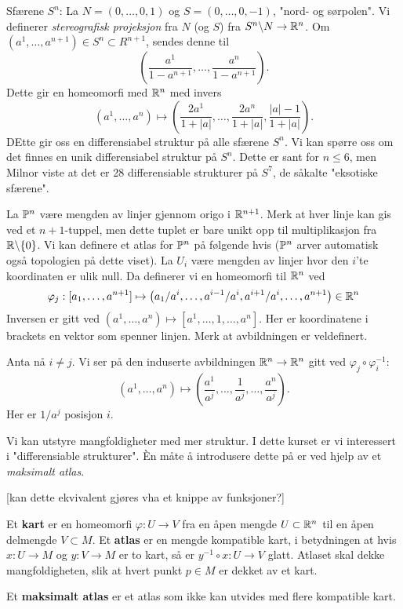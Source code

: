 \documentclass[11pt, english]{article}
\begin{document}
\begin{example}
Sfærene $S^n$: La $N=(0,\ldots,0,1)$ og $S=(0,\ldots,0,-1)$, "nord- og sørpolen". Vi definerer \emph{stereografisk projeksjon} fra $N$ (og $S$) fra $S^n \backslash N \to \mathbb{R}^n$. Om $(a^1,\ldots,a^{n+1}) \in S^n \subset R^{n+1}$, sendes denne til
$$
\left( \frac{a^1}{1-a^{n+1}}, \ldots, \frac{a^n}{1-a^{n+1}} \right).
$$
Dette gir en homeomorfi med $\mathbb{R}^n$ med invers
$$
(a^1, \ldots, a^n) \mapsto \left( \frac{2a^1}{1+\lvert a \rvert}, \ldots, \frac{2 a^n}{1+\lvert a \rvert}, \frac{\lvert a \rvert - 1}{1+\lvert a \rvert}\right).
$$
DEtte gir oss en differensiabel struktur på alle sfærene $S^n$. Vi kan spørre oss om det finnes en unik differensiabel struktur på $S^n$. Dette er sant for $n \leq 6$, men Milnor viste at det er 28 differensiable strukturer på $S^7$, de såkalte "eksotiske sfærene".
\end{example}
\begin{example}

La $\mathbb{P}^n$ være mengden av linjer gjennom origo i $\mathbb{R}^{n+1}$. Merk at hver linje kan gis ved et $n+1$-tuppel, men dette tuplet er bare unikt opp til multiplikasjon fra $\mathbb{R} \backslash \{ 0\}$. Vi kan definere et atlas for $\mathbb{P}^n$ på følgende hvis ($\mathbb{P}^n$ arver automatisk også topologien på dette viset). La $U_i$ være mengden av linjer hvor den $i$'te koordinaten er ulik null. Da definerer vi en homeomorfi til $\mathbb{R}^n$ ved 
$$
\varphi_j: [a_1,\ldots, a^{n+1}] \mapsto \left(a_1/a^i, \ldots, a^{i-1}/a^i, a^{i+1}/a^i,\ldots, a^{n+1}\right) \in \mathbb{R}^n
$$
Inversen er gitt ved $(a^1,\ldots, a^n) \mapsto [a^1, \ldots, 1, \ldots, a^n]$. Her er koordinatene i brackets en vektor som spenner linjen. Merk at avbildningen er veldefinert. 

Anta nå $i \neq j$. Vi ser på den induserte avbildningen $\mathbb{R}^n \to \mathbb{R}^n$ gitt ved $\varphi_j \circ \varphi_i^{-1}$:
$$
(a^1,\ldots, a^n) \mapsto \left( \frac{a^1}{a^j}, \ldots, \frac{1}{a^j}, \ldots, \frac{a^n}{a^j} \right).
$$
Her er $1/a^j$  posisjon $i$.
\end{example}


Vi kan utstyre mangfoldigheter med mer struktur. I dette kurset er vi interessert i "differensiable strukturer". Èn måte å introdusere dette på er ved hjelp av et \emph{maksimalt atlas}. 

[kan dette ekvivalent gjøres vha et knippe av funksjoner?]

\begin{defi}
Et \textbf{kart} er en homeomorfi $\varphi:U \to V$ fra en åpen mengde $U \subset \mathbb{R}^n$ til en åpen delmengde $V \subset M$. Et \textbf{atlas} er en mengde kompatible kart, i betydningen at hvis $x:U \to M$ og $y:V \to M$ er to kart, så er $y^{-1} \circ x : U \to V$ glatt. Atlaset skal dekke mangfoldigheten, slik at hvert punkt $p \in M$ er dekket av et kart. 

Et \textbf{maksimalt atlas} er et atlas som ikke kan utvides med flere kompatible kart.
\end{defi}
\end{document}
